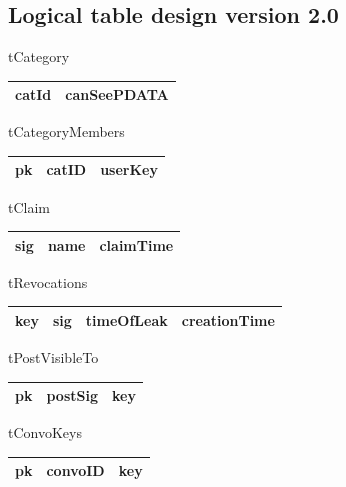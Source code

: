 \begin{enumerate}
\section{Logical table design version 2.0}

tCategory 
\begin{center}
    \begin{tabular}{ | l | l |}
    \hline
    catId & canSeePDATA \\ \hline
    \end{tabular}
\end{center}

tCategoryMembers
\begin{center}
    \begin{tabular}{ | l | l | l |}
    \hline
    pk & catID & userKey \\ \hline
    \end{tabular}
\end{center}

tClaim
\begin{center}
    \begin{tabular}{ | l | l | l |}
    \hline
    sig & name & claimTime \\ \hline
    \end{tabular}
\end{center}

tRevocations
\begin{center}
    \begin{tabular}{ | l | l | l | l |}
    \hline
    key & sig & timeOfLeak & creationTime \\ \hline
    \end{tabular}
\end{center}

tPostVisibleTo
\begin{center}
    \begin{tabular}{ | l | l | l |}
    \hline
    pk & postSig & key \\ \hline
    \end{tabular}
\end{center}

tConvoKeys
\begin{center}
    \begin{tabular}{ | l | l | l |}
    \hline
    pk & convoID & key \\ \hline
    \end{tabular}
\end{center}


\end{enumerate}
